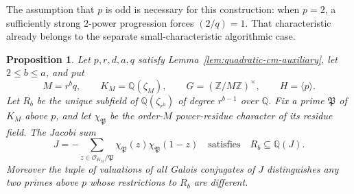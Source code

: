 \documentclass[11pt]{article}
\newtheorem{proposition}[theorem]{Proposition}
\theoremstyle{definition}
\theoremstyle{remark}
\begin{document}
The assumption that \(p\) is odd is necessary for this construction:
when \(p=2\), a sufficiently strong \(2\)-power progression forces
\((2/q)=1\). That characteristic already belongs to the separate
small-characteristic algorithmic case.

\begin{proposition}\label{prop:jacobi-wild-subfield}
Let \(p,r,d,a,q\) satisfy Lemma~\ref{lem:quadratic-cm-auxiliary},
let \(2\leq b\leq a\), and put
\[
 M=r^bq,\qquad K_M=\mathbb Q(\zeta_M),\qquad
 G=(\mathbb Z/M\mathbb Z)^\times,\qquad H=\langle p\rangle.
\]
Let \(R_b\) be the unique subfield of \(\mathbb Q(\zeta_{r^b})\)
of degree \(r^{b-1}\) over \(\mathbb Q\).
Fix a prime \(\mathfrak P\) of \(K_M\) above \(p\), and let
\(\chi_{\mathfrak P}\) be the order-\(M\) power-residue character
of its residue field. The Jacobi sum
\[
 J=-\sum_{z\in\mathcal O_{K_M}/\mathfrak P}
       \chi_{\mathfrak P}(z)\chi_{\mathfrak P}(1-z)
 \quad\text{satisfies}\quad
 R_b\subseteq\mathbb Q(J).
\]
Moreover the tuple of valuations of all Galois conjugates of \(J\) distinguishes
any two primes above \(p\) whose restrictions to \(R_b\) are
different.
\end{proposition}
\end{document}
